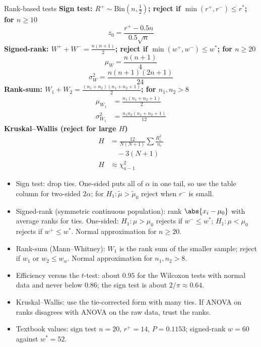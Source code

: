 \begin{formulabox}{Rank-based tests}
\textbf{Sign test: $R^+\sim\mathrm{Bin}(n,\tfrac12)$; reject if $\min(r^+,r^-)\le r^*$; for $n\ge10$}
\[ z_0=\frac{r^+-0.5n}{0.5\sqrt n} \]
\textbf{Signed-rank: $W^++W^-=\frac{n(n+1)}2$; reject if $\min(w^+,w^-)\le w^*$; for $n\ge20$}
\[ \mu_W=\frac{n(n+1)}{4} \]
\[ \sigma_W^2=\frac{n(n+1)(2n+1)}{24} \]
\textbf{Rank-sum: $W_1+W_2=\frac{(n_1+n_2)(n_1+n_2+1)}2$; for $n_1,n_2>8$}
\[ \begin{aligned}\mu_{W_1}&=\frac{n_1(n_1+n_2+1)}{2}\\[4pt] \sigma^2_{W_1}&=\frac{n_1n_2(n_1+n_2+1)}{12}\end{aligned} \]
\textbf{Kruskal--Wallis (reject for large $H$)}
\[ \begin{aligned}H&=\frac{12}{N(N+1)}\sum\frac{R_{i\cdot}^2}{n_i}\\ &\quad-3(N+1)\\ H&\approx\chi^2_{a-1}\end{aligned} \]
\end{formulabox}

\begin{notebox}
\begin{itemize}
  \item Sign test: drop ties. One-sided puts all of $\alpha$ in one tail, so use the table column for two-sided $2\alpha$; for $H_1:\tilde\mu>\tilde\mu_0$ reject when $r^-$ is small.
  \item Signed-rank (symmetric continuous population): rank $\abs{x_i-\mu_0}$ with average ranks for ties. One-sided: $H_1:\mu>\mu_0$ rejects if $w^-\le w^*$; $H_1:\mu<\mu_0$ rejects if $w^+\le w^*$. Normal approximation for $n\ge20$.
  \item Rank-sum (Mann--Whitney): $W_1$ is the rank sum of the smaller sample; reject if $w_1$ or $w_2\le w_\alpha$. Normal approximation for $n_1,n_2>8$.
  \item Efficiency versus the $t$-test: about $0.95$ for the Wilcoxon tests with normal data and never below $0.86$; the sign test is about $2/\pi\approx0.64$.
  \item Kruskal--Wallis: use the tie-corrected form with many ties. If ANOVA on ranks disagrees with ANOVA on the raw data, trust the ranks.
  \item Textbook values: sign test $n=20$, $r^+=14$, $P=0.1153$; signed-rank $w=60$ against $w^*=52$.
\end{itemize}
\end{notebox}

